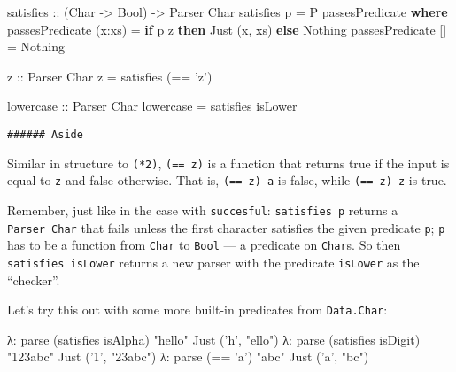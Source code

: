 \documentclass[]{article}
\newenvironment{Shaded}{}{}
\newcommand{\KeywordTok}[1]{\textcolor[rgb]{0.00,0.44,0.13}{\textbf{{#1}}}}
\newcommand{\DataTypeTok}[1]{\textcolor[rgb]{0.56,0.13,0.00}{{#1}}}
\newcommand{\CharTok}[1]{\textcolor[rgb]{0.25,0.44,0.63}{{#1}}}
\newcommand{\StringTok}[1]{\textcolor[rgb]{0.25,0.44,0.63}{{#1}}}
\newcommand{\OtherTok}[1]{\textcolor[rgb]{0.00,0.44,0.13}{{#1}}}
\newcommand{\FunctionTok}[1]{\textcolor[rgb]{0.02,0.16,0.49}{{#1}}}
\newcommand{\NormalTok}[1]{{#1}}
\begin{document}
\begin{Shaded}
\begin{Highlighting}[]
\OtherTok{satisfies ::} \NormalTok{(}\DataTypeTok{Char} \OtherTok{->} \DataTypeTok{Bool}\NormalTok{) }\OtherTok{->} \DataTypeTok{Parser} \DataTypeTok{Char}
\NormalTok{satisfies p }\FunctionTok{=} \DataTypeTok{P} \NormalTok{passesPredicate}
    \KeywordTok{where}
        \NormalTok{passesPredicate (x}\FunctionTok{:}\NormalTok{xs) }\FunctionTok{=}  \KeywordTok{if} \NormalTok{p z}
                                      \KeywordTok{then} \DataTypeTok{Just} \NormalTok{(x, xs)}
                                      \KeywordTok{else} \DataTypeTok{Nothing}
        \NormalTok{passesPredicate []     }\FunctionTok{=}  \DataTypeTok{Nothing}


\OtherTok{z ::} \DataTypeTok{Parser} \DataTypeTok{Char}
\NormalTok{z }\FunctionTok{=} \NormalTok{satisfies (}\FunctionTok{==} \CharTok{'z'}\NormalTok{)}

\OtherTok{lowercase ::} \DataTypeTok{Parser} \DataTypeTok{Char}
\NormalTok{lowercase }\FunctionTok{=} \NormalTok{satisfies isLower}
\end{Highlighting}
\end{Shaded}

\begin{verbatim}
###### Aside
\end{verbatim}

Similar in structure to \texttt{(*2)},
\texttt{(==\ \textquotesingle{}z\textquotesingle{})} is a function that
returns true if the input is equal to
\texttt{\textquotesingle{}z\textquotesingle{}} and false otherwise. That
is,
\texttt{(==\ \textquotesingle{}z\textquotesingle{})\ \textquotesingle{}a\textquotesingle{}}
is false, while
\texttt{(==\ \textquotesingle{}z\textquotesingle{})\ \textquotesingle{}z\textquotesingle{}}
is true.

Remember, just like in the case with \texttt{succesful}:
\texttt{satisfies\ p} returns a \texttt{Parser\ Char} that fails unless
the first character satisfies the given predicate \texttt{p}; \texttt{p}
has to be a function from \texttt{Char} to \texttt{Bool} --- a predicate
on \texttt{Char}s. So then \texttt{satisfies\ isLower} returns a new
parser with the predicate \texttt{isLower} as the ``checker''.

Let's try this out with some more built-in predicates from
\texttt{Data.Char}:

\begin{Shaded}
\begin{Highlighting}[]
\NormalTok{λ}\FunctionTok{:} \NormalTok{parse (satisfies isAlpha) }\StringTok{"hello"}
\DataTypeTok{Just} \NormalTok{(}\CharTok{'h'}\NormalTok{, }\StringTok{"ello"}\NormalTok{)}
\NormalTok{λ}\FunctionTok{:} \NormalTok{parse (satisfies isDigit) }\StringTok{"123abc"}
\DataTypeTok{Just} \NormalTok{(}\CharTok{'1'}\NormalTok{, }\StringTok{"23abc"}\NormalTok{)}
\NormalTok{λ}\FunctionTok{:} \NormalTok{parse (}\FunctionTok{==} \CharTok{'a'}\NormalTok{) }\StringTok{"abc"}
\DataTypeTok{Just} \NormalTok{(}\CharTok{'a'}\NormalTok{, }\StringTok{"bc"}\NormalTok{)}
\end{Highlighting}
\end{Shaded}
\end{document}
